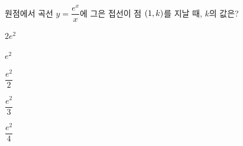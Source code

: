 원점에서 곡선 $y=\dfrac{e^x}{x}$에 그은 접선이 점 $(1{,}\mkern3mu\mathopen{}k)$를 지날 때, $k$의 값은?
\begin{choices32}{\rule[-3ex]{0pt}{8ex}$2e^2$}{\rule[-3ex]{0pt}{8ex}$e^2$}{\rule[-3ex]{0pt}{8ex}$\dfrac{e^2}{2}$}{\rule[-3ex]{0pt}{8ex}$\dfrac{e^2}{3}$}{\rule[-3ex]{0pt}{8ex}$\dfrac{e^2}{4}$}\end{choices32}
